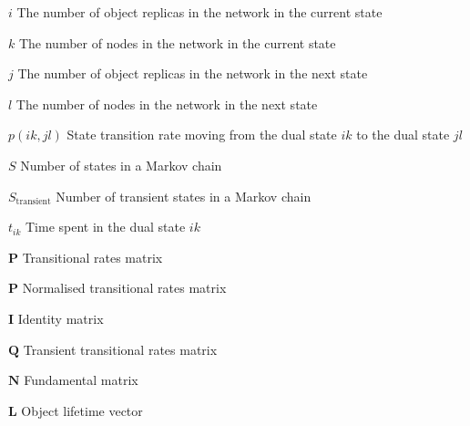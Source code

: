 \begin{Nomencl}[\gnat]
        \item[$i$]                      The number of object replicas in the network in the current state
        \item[$k$]                      The number of nodes in the network in the current state
        \item[$j$]                      The number of object replicas in the network in the next state
        \item[$l$]                      The number of nodes in the network in the next state
        \item[$p(ik, jl)$]              State transition rate moving from the dual state $ik$ to the dual state $jl$
        \item[$S$]                      Number of states in a Markov chain
        \item[$S_\textrm{transient}$]   Number of transient states in a Markov chain
        \item[$t_{ik}$]                 Time spent in the dual state $ik$
        \item[$\textbf{P}$]             Transitional rates matrix
        \item[$\textbf{\^{P}}$]         Normalised transitional rates matrix
        \item[$\textbf{I}$]             Identity matrix
        \item[$\textbf{Q}$]             Transient transitional rates matrix
        \item[$\textbf{N}$]             Fundamental matrix
        \item[$\textbf{L}$]             Object lifetime vector


\end{Nomencl}
